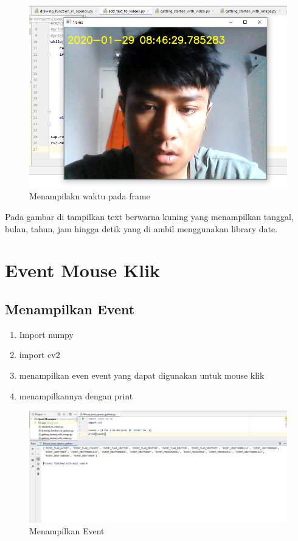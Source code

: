 \begin{figure}[ht]
\centering
\includegraphics[scale=0.6]{figures/2,18.jpg}
\caption{Menampilakn waktu pada frame}
\label{contoh}
\end{figure}
Pada gambar di tampilkan text berwarna kuning yang menampilkan tanggal, bulan, tahun, jam hingga detik yang di ambil menggunakan library date.



\newpage
\section{Event Mouse Klik}
\subsection{Menampilkan Event}

\begin{enumerate}
	\item Import numpy
	\item import cv2
	\item menampilkan even event yang dapat digunakan untuk mouse klik
	\item menampilkannya dengan print
\end{enumerate}

\begin{figure}[ht]
\centering
\includegraphics[scale=0.4]{figures/2,19.jpg}
\caption{Menampilkan Event}
\label{contoh}
\end{figure}



